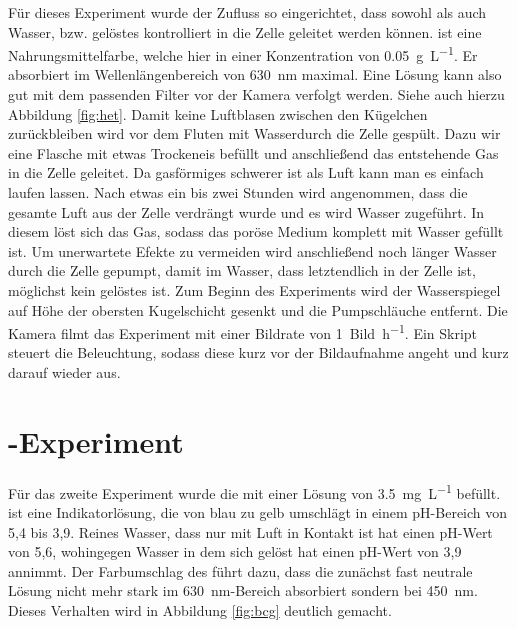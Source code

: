 Für dieses Experiment wurde der Zufluss so eingerichtet, dass sowohl \COT als auch Wasser, bzw. gelöstes \BB kontrolliert in die Zelle geleitet werden können. \BB ist eine Nahrungsmittelfarbe, welche hier in einer Konzentration von \SI{0,05}{\gram\per\liter}. Er absorbiert im Wellenlängenbereich von \SI{630}{\nano\meter} maximal. Eine \BB Lösung kann also gut mit dem passenden Filter vor der Kamera verfolgt werden. Siehe auch hierzu Abbildung \ref{fig:het}.
Damit keine Luftblasen zwischen den Kügelchen zurückbleiben wird vor dem Fluten mit Wasser\COT durch die Zelle gespült. Dazu wir eine Flasche mit etwas Trockeneis befüllt und anschließend das entstehende Gas in die Zelle geleitet. Da gasförmiges \COT schwerer ist als Luft kann man es einfach laufen lassen. Nach etwas ein bis zwei Stunden wird angenommen, dass die gesamte Luft aus der Zelle verdrängt wurde und es wird Wasser zugeführt. In diesem löst sich das Gas, sodass das poröse Medium komplett mit Wasser gefüllt ist. Um unerwartete Efekte zu vermeiden wird anschließend noch länger Wasser durch die Zelle gepumpt, damit im Wasser, dass letztendlich in der Zelle ist, möglichst kein gelöstes \COT ist.
Zum Beginn des Experiments wird der Wasserspiegel auf Höhe der obersten Kugelschicht gesenkt und die Pumpschläuche entfernt.
Die Kamera filmt das Experiment mit einer Bildrate von \SI{1}{Bild\per\hour}. Ein Skript steuert die Beleuchtung, sodass diese kurz vor der Bildaufnahme angeht und kurz darauf wieder aus.



\section{\COT-Experiment}
\label{sec:cot}
Für das zweite Experiment wurde die \HSCs mit einer \BCG Lösung von \SI{3,5}{\milli\gram\per\liter} befüllt. 
\BCG ist eine Indikatorlösung, die von blau zu gelb umschlägt in einem pH-Bereich von 5,4 bis 3,9. Reines Wasser, dass nur mit Luft in Kontakt ist hat einen pH-Wert von 5,6, wohingegen Wasser in dem sich \COT gelöst hat einen pH-Wert von 3,9 annimmt. 
Der Farbumschlag des \BCG führt dazu, dass die zunächst fast neutrale Lösung nicht mehr stark im \SI{630}{\nano\meter}-Bereich absorbiert sondern bei \SI{450}{\nano\meter}. Dieses Verhalten wird in Abbildung \ref{fig:bcg} deutlich gemacht.


